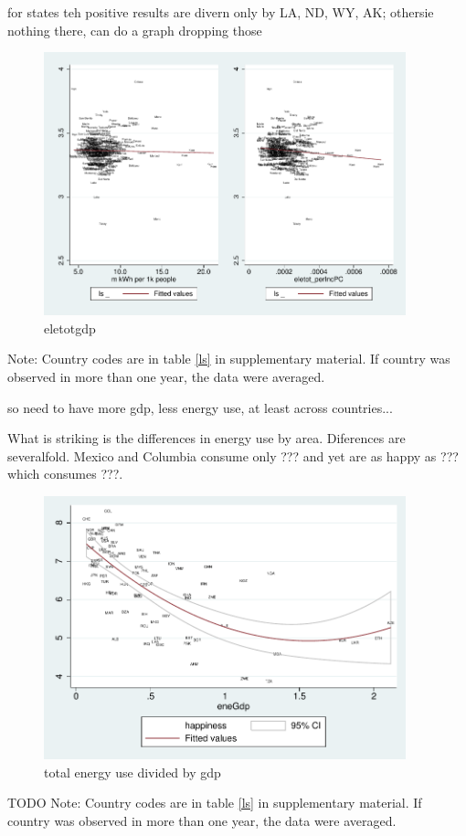 \documentclass[10pt, letterpaper]{article}
\begin{document}
\begin{spacing}{1.4}
for states teh positive results are divern only by LA, ND, WY, AK; othersie
nothing there, can do a graph dropping those

\begin{figure}[H]
 \includegraphics[height=3in]{graphsAndTables/eletot_gdp.pdf}\centering
\caption{eletotgdp}\label{eletotgdp}
\end{figure}
{\scriptsize Note: Country codes are in table \ref{ls} in supplementary
  material. If country was observed in more than one year, the data were averaged.}



so need to have more gdp, less energy use, at least across countries...


What is striking is the differences in energy use by area. Diferences are
severalfold. Mexico and Columbia
consume only ??? and yet are as happy as ??? which consumes ???.


\begin{figure}[H]
 \includegraphics[height=3in]{graphsAndTables/couWvsLsEnePerGdp.pdf}\centering
\caption{total energy use divided by gdp}\label{}
\end{figure}
{\scriptsize TODO Note: Country codes are in table \ref{ls} in supplementary
  material. If country was observed in more than one year, the data were averaged.}


\end{spacing}
\end{document}
